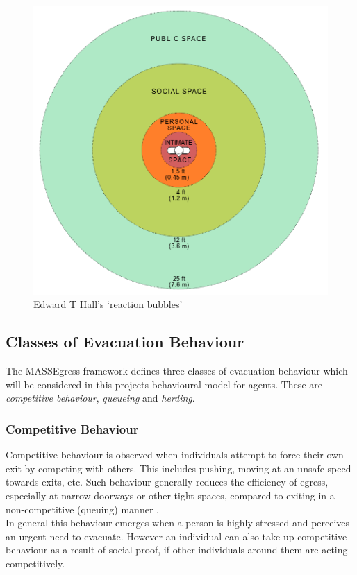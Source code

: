 \begin{figure}
\centering
\includegraphics[scale=0.4]{../images/Personal_Space.png}
\caption{Edward T Hall's `reaction bubbles'}
\label{fig:personalSpace}
\end{figure}


\subsection{Classes of Evacuation Behaviour}
The MASSEgress framework \cite{MultiAgentFramework,PanMASSEgressThesis,IndivBehaviourPseudo} defines three classes of evacuation behaviour which will be considered in this projects behavioural model for agents. These are \emph{competitive behaviour}, \emph{queueing} and \emph{herding}.
\subsubsection{Competitive Behaviour}
Competitive behaviour is observed when individuals attempt to force their own exit by competing with others. This includes pushing, moving at an unsafe speed towards exits, etc. Such behaviour generally reduces the efficiency of egress, especially at narrow doorways or other tight spaces\cite{BottleneckStudy}, compared to exiting in a non-competitive (queuing) manner \cite{EgressBehaviourKirchner}.\\
In general this behaviour emerges when a person is highly stressed and perceives an urgent need to evacuate. However an individual can also take up competitive behaviour as a result of social proof, if other individuals around them are acting competitively.
